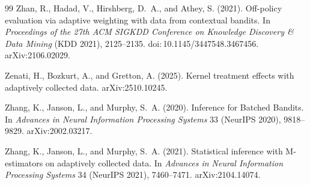 \documentclass[11pt]{article}
\numberwithin{equation}{section}
\theoremstyle{plain}
\theoremstyle{definition}
\theoremstyle{remark}
\newcommand{\doi}[1]{doi:\,#1}
\newcommand{\arxiv}[1]{arXiv:#1}
\begin{document}
\begin{thebibliography}{99}
Zhan, R., Hadad, V., Hirshberg, D.~A., and Athey, S. (2021).
Off-policy evaluation via adaptive weighting with data from contextual bandits.
In \emph{Proceedings of the 27th ACM SIGKDD Conference on Knowledge Discovery \& Data Mining} (KDD 2021), 2125--2135. \doi{10.1145/3447548.3467456}. \arxiv{2106.02029}.

Zenati, H., Bozkurt, A., and Gretton, A. (2025).
Kernel treatment effects with adaptively collected data.
\arxiv{2510.10245}.

Zhang, K., Janson, L., and Murphy, S.~A. (2020).
Inference for Batched Bandits.
In \emph{Advances in Neural Information Processing Systems} 33 (NeurIPS 2020), 9818--9829. \arxiv{2002.03217}.

Zhang, K., Janson, L., and Murphy, S.~A. (2021).
Statistical inference with M-estimators on adaptively collected data.
In \emph{Advances in Neural Information Processing Systems} 34 (NeurIPS 2021), 7460--7471. \arxiv{2104.14074}.

\end{thebibliography}
\fi
\end{document}
